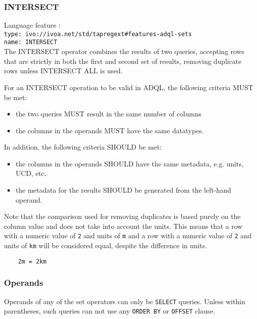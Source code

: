 \documentclass[11pt,a4paper]{ivoa}
\begin{document}
\subsubsection{INTERSECT}
{\footnotesize Language feature :}\\
{\footnotesize \verb|type: ivo://ivoa.net/std/tapregext#features-adql-sets|}\\
{\footnotesize \verb|name: INTERSECT|}\\

The INTERSECT operator combines the results of two queries, accepting rows
that are strictly in both the first and second set of results,
removing duplicate rows unless INTERSECT ALL is used.

For an INTERSECT operation to be valid in ADQL, the following criteria MUST be met:

\begin{itemize}
    \item the two queries MUST result in the same number of columns
    \item the columns in the operands MUST have the same datatypes.
\end{itemize}

In addition, the following criteria SHOULD be met:
\begin{itemize}
    \item the columns in the operands SHOULD have the same metadata, e.g. units, UCD, etc.
    \item the metadata for the results SHOULD be generated from the left-hand operand.
\end{itemize}

Note that the comparison used for removing duplicates is based purely on the
column value and does not take into account the units.
This means that a row with a numeric value of \verb:2: and units of \verb:m:
and a row with a numeric value of \verb:2: and units of \verb:km: will be
considered equal, despite the difference in units.
\begin{verbatim}
    2m = 2km
\end{verbatim}

\subsubsection{Operands}

Operands of any of the set operators can only be \verb:SELECT: queries.
Unless within parentheses, such queries can not use any \verb:ORDER BY: or
\verb:OFFSET: clause.
\end{document}
